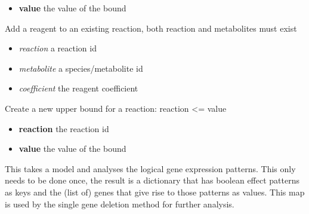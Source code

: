 \documentclass[a4paper,11pt,english]{sphinxmanual}
\begin{document}
\begin{fulllineitems}
\begin{fulllineitems}
\begin{itemize}
\item {} 
\textbf{value} the value of the bound

\end{itemize}

\end{fulllineitems}


\begin{fulllineitems}
\label{modules_doc:cbmpy.CBModel.Model.createReactionReagent}
Add a reagent to an existing reaction, both reaction and metabolites must exist
\begin{itemize}
\item {} 
\emph{reaction} a reaction id

\item {} 
\emph{metabolite} a species/metabolite id

\item {} 
\emph{coefficient} the reagent coefficient

\end{itemize}

\end{fulllineitems}


\begin{fulllineitems}
\label{modules_doc:cbmpy.CBModel.Model.createReactionUpperBound}
Create a new upper bound for a reaction: reaction \textless{}= value
\begin{itemize}
\item {} 
\textbf{reaction} the reaction id

\item {} 
\textbf{value} the value of the bound

\end{itemize}

\end{fulllineitems}


\begin{fulllineitems}
\label{modules_doc:cbmpy.CBModel.Model.createSingleGeneEffectMap}
This takes a model and analyses the logical gene expression patterns. This only needs to be done once,
the result is a dictionary that has boolean effect patterns as keys and the (list of) genes that give rise to
those patterns as values. This map is used by the single gene deletion method for further analysis.


\end{fulllineitems}
\end{fulllineitems}
\end{document}
